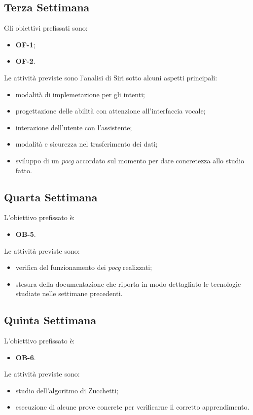 	\subsection*{Terza Settimana}
	Gli obiettivi prefissati sono:
	\begin{itemize}
		\item \textbf{OF-1};
		\item \textbf{OF-2}.
	\end{itemize}
	Le attività previste sono l'analisi di Siri sotto alcuni aspetti principali:
	\begin{itemize}
		\item modalità di implemetazione per gli intenti;
		\item progettazione delle abilità con attenzione all'interfaccia vocale;
		\item interazione dell'utente con l'assistente;
		\item modalità e sicurezza nel trasferimento dei dati;
		\item sviluppo di un \emph{\gls{pocg}} accordato sul momento per dare concretezza allo studio fatto.
	\end{itemize}
	\subsection*{Quarta Settimana}
	L'obiettivo prefissato è:
	\begin{itemize}
		\item \textbf{OB-5}.
	\end{itemize}
	Le attività previste sono:
	\begin{itemize}
		\item verifica del funzionamento dei \emph{\gls{pocg}} realizzati;
		\item stesura della documentazione che riporta in modo dettagliato le tecnologie studiate nelle settimane precedenti.
	\end{itemize}
	\subsection*{Quinta Settimana}
	L'obiettivo prefissato è:
	\begin{itemize}
		\item \textbf{OB-6}.
	\end{itemize}
	Le attività previste sono:
	\begin{itemize}
		\item studio dell'algoritmo di Zucchetti;
		\item esecuzione di alcune prove concrete per verificarne il corretto apprendimento.
	\end{itemize}

